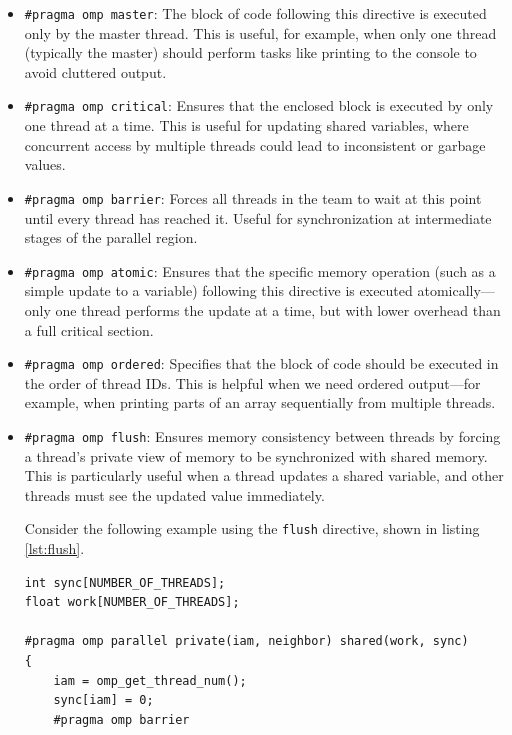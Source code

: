 \documentclass[12pt]{book}
\begin{document}
\begin{itemize}
    \item \texttt{\#pragma omp master}: The block of code following this directive is executed only by the master thread. This is useful, for example, when only one thread (typically the master) should perform tasks like printing to the console to avoid cluttered output.

    \item \texttt{\#pragma omp critical}: Ensures that the enclosed block is executed by only one thread at a time. This is useful for updating shared variables, where concurrent access by multiple threads could lead to inconsistent or garbage values.

    \item \texttt{\#pragma omp barrier}: Forces all threads in the team to wait at this point until every thread has reached it. Useful for synchronization at intermediate stages of the parallel region.

    \item \texttt{\#pragma omp atomic}: Ensures that the specific memory operation (such as a simple update to a variable) following this directive is executed atomically—only one thread performs the update at a time, but with lower overhead than a full critical section.

    \item \texttt{\#pragma omp ordered}: Specifies that the block of code should be executed in the order of thread IDs. This is helpful when we need ordered output—for example, when printing parts of an array sequentially from multiple threads.

    \item \texttt{\#pragma omp flush}: Ensures memory consistency between threads by forcing a thread’s private view of memory to be synchronized with shared memory. This is particularly useful when a thread updates a shared variable, and other threads must see the updated value immediately.

    Consider the following example using the \texttt{flush} directive, shown in listing \ref{lst:flush}.

\begin{lstlisting}[style=cppstyle, caption={Flush Directive}, captionpos=b, label={lst:flush}]
int sync[NUMBER_OF_THREADS];
float work[NUMBER_OF_THREADS];

#pragma omp parallel private(iam, neighbor) shared(work, sync)
{
    iam = omp_get_thread_num();
    sync[iam] = 0;
    #pragma omp barrier


\end{lstlisting}
\end{itemize}
\end{document}
